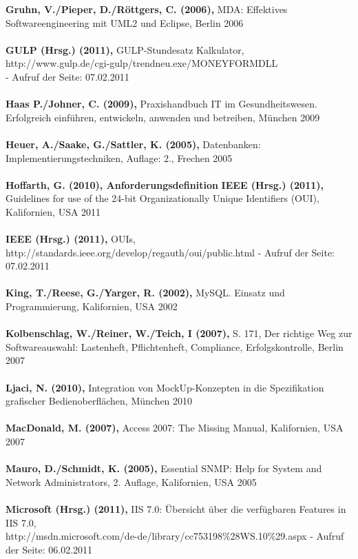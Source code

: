 \textbf{Gruhn, V./Pieper, D./Röttgers, C. (2006),} MDA: Effektives Softwareengineering mit UML2 und Eclipse, Berlin 2006\\\\
\textbf{GULP (Hrsg.) (2011),} GULP-Stundesatz Kalkulator,\\http://www.gulp.de/cgi-gulp/trendneu.exe/MONEYFORMDLL\\ - Aufruf der Seite: 07.02.2011\\\\
\textbf{Haas P./Johner, C. (2009),} Praxishandbuch IT im Gesundheitswesen. Erfolgreich einführen, entwickeln, anwenden und betreiben, München 2009\\\\
\textbf{Heuer, A./Saake, G./Sattler, K. (2005),} Datenbanken: Implementierungstechniken, Auflage: 2., Frechen 2005\\\\
\textbf{Hoffarth, G. (2010), Anforderungsdefinition}
\textbf{IEEE (Hrsg.) (2011),} Guidelines for use of the 24-bit Organizationally Unique Identifiers (OUI), Kalifornien, USA 2011\\\\
\textbf{IEEE (Hrsg.) (2011),} OUIs,\\http://standards.ieee.org/develop/regauth/oui/public.html - Aufruf der Seite: 07.02.2011\\\\
\textbf{King, T./Reese, G./Yarger, R. (2002),} MySQL. Einsatz und Programmierung, Kalifornien, USA 2002\\\\
\textbf{Kolbenschlag, W./Reiner, W./Teich, I (2007),} S. 171, Der richtige Weg zur Softwareauswahl: Lastenheft, Pflichtenheft, Compliance, Erfolgskontrolle, Berlin 2007\\\\
\textbf{Ljaci, N. (2010),} Integration von MockUp-Konzepten in die Spezifikation grafischer Bedienoberflächen, München 2010\\\\
\clearpage
\textbf{MacDonald, M. (2007),} Access 2007: The Missing Manual, Kalifornien, USA 2007\\\\
\textbf{Mauro, D./Schmidt, K. (2005),} Essential SNMP: Help for System and Network Administrators, 2. Auflage, Kalifornien, USA 2005\\\\
\textbf{Microsoft (Hrsg.) (2011),} IIS 7.0: Übersicht über die verfügbaren Features in IIS 7.0,\\http://msdn.microsoft.com/de-de/library/cc753198\%28WS.10\%29.aspx - Aufruf der Seite: 06.02.2011\\\\

